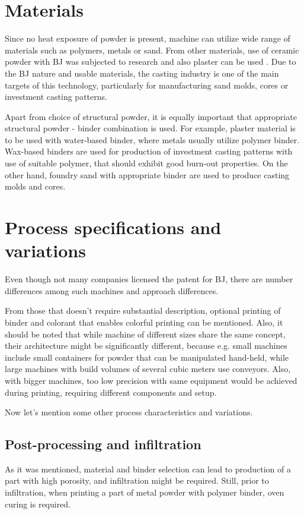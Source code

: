 \documentclass[a4paper, 11pt, reqno]{report}
\begin{document}
\section{Materials}
Since no heat exposure of powder is present, machine can utilize wide range of materials such as polymers, metals or sand. From other materials, use of ceramic powder with BJ was subjected to research and also plaster can be used \cite[p. 208]{AMT} \cite{ZCorp}. Due to the BJ nature and usable materials, the casting industry is one of the main targets of this technology, particularly for manufacturing sand molds, cores or investment casting patterns.
	
	Apart from choice of structural powder, it is equally important that appropriate structural powder - binder combination is used. For example, plaster material is to be used with water-based binder, where metals usually utilize polymer binder. Wax-based binders are used for production of investment casting patterns with use of suitable polymer, that should exhibit good burn-out properties. On the other hand, foundry sand with appropriate binder are used to produce casting molds and cores.

\section{Process specifications and variations}
Even though not many companies licensed the patent for BJ, there are number differences among such machines and approach differences.

	From those that doesn't require substantial description, optional printing of binder and colorant that enables colorful printing can be mentioned. Also, it should be noted that while machine of different sizes share the same concept, their architecture might be significantly different, because e.g. small machines include small containers for powder that can be manipulated hand-held, while large machines with build volumes of several cubic meters use conveyors. Also, with bigger machines, too low precision with same equipment would be achieved during printing, requiring different components and setup.
	
	Now let's mention some other process characteristics and variations.	
\subsection{Post-processing and infiltration}
As it was mentioned, material and binder selection can lead to production of a part with high porosity, and infiltration might be required. Still, prior to infiltration, when printing a part of metal powder with polymer binder, oven curing is required.
\end{document}
